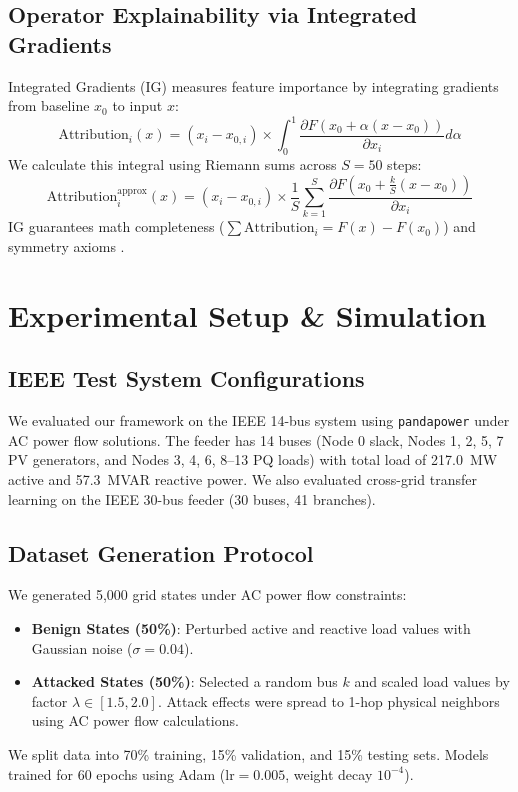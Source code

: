 \documentclass[conference]{IEEEtran}
\begin{document}
\subsection{Operator Explainability via Integrated Gradients}
Integrated Gradients (IG) measures feature importance by integrating gradients from baseline $x_0$ to input $x$:
\begin{equation}
\text{Attribution}_i(x) = (x_i - x_{0,i}) \times \int_{0}^{1} \frac{\partial F(x_0 + \alpha(x - x_0))}{\partial x_i} d\alpha
\end{equation}
We calculate this integral using Riemann sums across $S = 50$ steps:
\begin{equation}
\text{Attribution}_i^{\text{approx}}(x) = (x_i - x_{0,i}) \times \frac{1}{S} \sum_{k=1}^S \frac{\partial F\left(x_0 + \frac{k}{S}(x - x_0)\right)}{\partial x_i}
\end{equation}
IG guarantees math completeness ($\sum \text{Attribution}_i = F(x) - F(x_0)$) and symmetry axioms \cite{b7}.

\section{Experimental Setup \& Simulation}

\subsection{IEEE Test System Configurations}
We evaluated our framework on the IEEE 14-bus system using \texttt{pandapower} under AC power flow solutions. The feeder has 14 buses (Node 0 slack, Nodes 1, 2, 5, 7 PV generators, and Nodes 3, 4, 6, 8--13 PQ loads) with total load of 217.0~MW active and 57.3~MVAR reactive power. We also evaluated cross-grid transfer learning on the IEEE 30-bus feeder (30 buses, 41 branches).

\subsection{Dataset Generation Protocol}
We generated 5,000 grid states under AC power flow constraints:
\begin{itemize}
    \item \textbf{Benign States (50\%)}: Perturbed active and reactive load values with Gaussian noise ($\sigma = 0.04$).
    \item \textbf{Attacked States (50\%)}: Selected a random bus $k$ and scaled load values by factor $\lambda \in [1.5, 2.0]$. Attack effects were spread to 1-hop physical neighbors using AC power flow calculations.
\end{itemize}
We split data into 70\% training, 15\% validation, and 15\% testing sets. Models trained for 60 epochs using Adam ($\text{lr} = 0.005$, weight decay $10^{-4}$).
\end{document}
